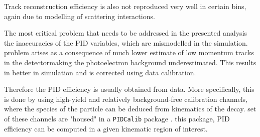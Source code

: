 Track reconstruction efficiency is also not reproduced very well in certain \DIFdelbegin {}\DIFdelend \DIFaddbegin {}\DIFaddend bins, again due to modelling of scattering interactions.

The most critical problem that needs to be addressed in the presented analysis \DIFdelbegin {}\DIFdelend \DIFaddbegin {}\DIFaddend the inaccuracies of the \Gls{PID} variables, which are mismodelled in the simulation. \DIFdelbegin {}\DIFdelend \DIFaddbegin {}\DIFaddend problem arises as a consequence of \DIFaddbegin {}\DIFaddend much lower estimate of low momentum tracks in the detector\DIFaddbegin \DIFadd{, }\DIFaddend making the photoelectron background underestimated. This results in better \DIFdelbegin {}\DIFdelend \DIFaddbegin {}\DIFaddend in simulation and is corrected using \DIFaddbegin {}\DIFaddend data calibration. 

Therefore the \gls{PID} efficiency is usually obtained from \DIFaddbegin {}\DIFaddend data. More specifically, this is done by using high-yield and relatively background-free calibration channels, where the species of the particle can be deduced from kinematics of the decay. \DIFdelbegin {}\DIFdelend \DIFaddbegin {}\DIFaddend set of these channels are "housed" in a \texttt{PIDCalib} package \cite{Anderlini:2202412}. \DIFdelbegin {}\DIFdelend \DIFaddbegin {}\DIFaddend this package, \DIFaddbegin {}\DIFaddend \gls{PID} efficiency can be computed in a given kinematic region of interest. 


